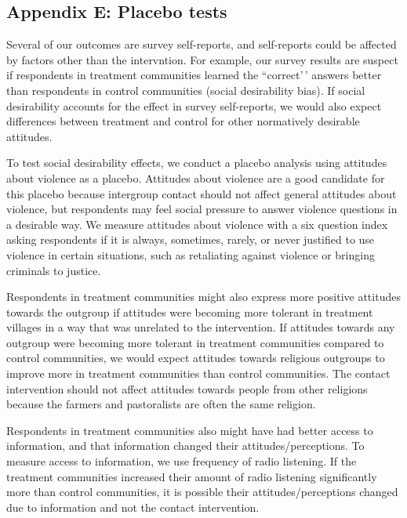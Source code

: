 \documentclass[
]{article}
\begin{document}
\hypertarget{appendix-e-placebo-tests}{%
\subsection{Appendix E: Placebo tests}\label{appendix-e-placebo-tests}}

Several of our outcomes are survey self-reports, and self-reports could
be affected by factors other than the intervntion. For example, our
survey results are suspect if respondents in treatment communities
learned the ``correct'\,' answers better than respondents in control
communities (social desirability bias). If social desirability accounts
for the effect in survey self-reports, we would also expect differences
between treatment and control for other normatively desirable attitudes.

To test social desirability effects, we conduct a placebo analysis using
attitudes about violence as a placebo. Attitudes about violence are a
good candidate for this placebo because intergroup contact should not
affect general attitudes about violence, but respondents may feel social
pressure to answer violence questions in a desirable way. We measure
attitudes about violence with a six question index asking respondents if
it is always, sometimes, rarely, or never justified to use violence in
certain situations, such as retaliating against violence or bringing
criminals to justice.

Respondents in treatment communities might also express more positive
attitudes towards the outgroup if attitudes were becoming more tolerant
in treatment villages in a way that was unrelated to the intervention.
If attitudes towards any outgroup were becoming more tolerant in
treatment communities compared to control communities, we would expect
attitudes towards religious outgroups to improve more in treatment
communities than control communities. The contact intervention should
not affect attitudes towards people from other religions because the
farmers and pastoralists are often the same religion.

Respondents in treatment communities also might have had better access
to information, and that information changed their
attitudes/perceptions. To measure access to information, we use
frequency of radio listening. If the treatment communities increased
their amount of radio listening significantly more than control
communities, it is possible their attitudes/perceptions changed due to
information and not the contact intervention.
\end{document}
